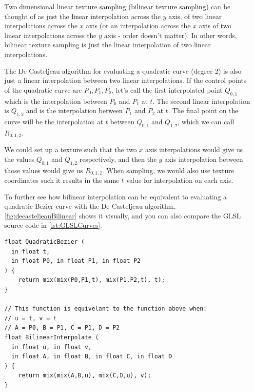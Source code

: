 \documentclass{jcgt}
\begin{document}
Two dimensional linear texture sampling (bilinear texture sampling) can be thought of as just the linear interpolation across the $y$ axis, of two linear interpolations across the $x$ axis (or an interpolation across the $x$ axis of two linear interpolations across the $y$ axis - order doesn't matter).  In other words, bilinear texture sampling is just the linear interpolation of two linear interpolations. 

The De Casteljeau algorithm for evaluating a quadratic curve (degree 2) is also just a linear interpolation between two linear interpolations.  If the control points of the quadratic curve are $P_0,P_1,P_2$, let's call the first interpolated point $Q_{0,1}$ which is the interpolation between $P_0$ and $P_1$ at $t$. The second linear interpolation is $Q_{1,2}$ and is the interpolation between $P_1$ and $P_2$ at $t$.  The final point on the curve will be the interpolation at $t$ between $Q_{0,1}$ and $Q_{1,2}$, which we can call $R_{0,1,2}$.  

We could set up a texture such that the two $x$ axis interpolations would give us the values $Q_{0,1}$ and $Q_{1,2}$ respectively, and then the $y$ axis interpolation between those values would give us $R_{0,1,2}$.  When sampling, we would also use texture coordinates such it results in the same $t$ value for interpolation on each axis.

To further see how bilinear interpolation can be equivalent to evaluating a quadratic Bezier curve with the De Casteljeau algorithm, \autoref{fig:decasteljeauBilinear} shows it visually, and you can also compare the GLSL source code in \autoref{lst:GLSLCurves}.

\begin{lstlisting}[caption={GLSL implementation of bilinear interpolation and the De Casteljeau algorithm for a quadratic Bezier curve.}, label={lst:GLSLCurves}]
float QuadraticBezier (
  in float t,
  in float P0, in float P1, in float P2
) {
    return mix(mix(P0,P1,t), mix(P1,P2,t), t);
}

// This function is equivelant to the function above when:
// u = t, v = t
// A = P0, B = P1, C = P1, D = P2
float BilinearInterpolate (
  in float u, in float v,
  in float A, in float B, in float C, in float D
) {
    return mix(mix(A,B,u), mix(C,D,u), v);
}

\end{lstlisting}
\end{document}
